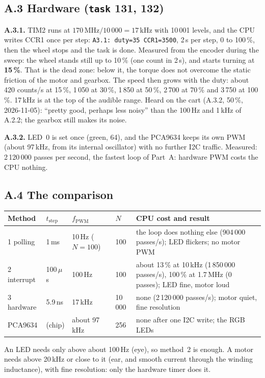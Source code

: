 \documentclass[11pt,a4paper]{article}
\newcommand{\lv}[1]{\texttt{#1}}                 %
\begin{document}
\subsection*{A.3 Hardware (\lv{task} 131, 132)}
\textbf{A.3.1.} TIM2 runs at $170\,\mathrm{MHz}/10\,000 = 17$\,kHz with 10\,001 levels, and the CPU writes CCR1 once
per step: \texttt{A3.1: duty=35 CCR1=3500}, 2\,s per step, 0 to 100\,\%, then the wheel stops and the task is done.
Measured from the encoder during the sweep: the wheel stands still up to 10\,\% (one count in 2\,s), and starts
turning at \textbf{15\,\%}. That is the dead zone: below it, the torque does not overcome the static friction of the
motor and gearbox. The speed then grows with the duty: about 420 counts/s at 15\,\%, 1\,050 at 30\,\%, 1\,850 at
50\,\%, 2\,700 at 70\,\% and 3\,750 at 100\,\%. 17\,kHz is at the top of the audible range. Heard on the cart (A.3.2, 50\,\%, 2026-11-05):
``pretty good, perhaps less noisy'' than the 100\,Hz and 1\,kHz of A.2.2; the gearbox still makes its noise.

\textbf{A.3.2.} LED~0 is set once (green, 64), and the PCA9634 keeps its own PWM (about 97\,kHz, from its internal
oscillator) with no further I2C traffic. Measured: 2\,120\,000 passes per second, the fastest loop of Part~A:
hardware PWM costs the CPU nothing.

\subsection*{A.4 The comparison}
\begin{tabularx}{\textwidth}{@{}l l l l L@{}}
\toprule
Method & $t_\mathrm{step}$ & $f_\mathrm{PWM}$ & $N$ & CPU cost and result \\
 polling & 1\,ms & 10\,Hz ($N = 100$) & 100 & the loop does nothing else (904\,000 passes/s); LED flickers; no motor PWM \\
2 interrupt & 100\,$\mu$s & 100\,Hz & 100 & about 13\,\% at 10\,kHz (1\,850\,000 passes/s), 100\,\% at 1.7\,MHz (0 passes); LED fine, motor loud \\
3 hardware & 5.9\,ns & 17\,kHz & 10\,000 & none (2\,120\,000 passes/s); motor quiet, fine resolution \\
PCA9634 & (chip) & about 97\,kHz & 256 & none after one I2C write; the RGB LEDs \\
\bottomrule
\end{tabularx}

\noindent An LED needs only above about 100\,Hz (eye), so method~2 is enough. A motor needs above 20\,kHz or close
to it (ear, and smooth current through the winding inductance), with fine resolution: only the hardware timer does it.
\end{document}
